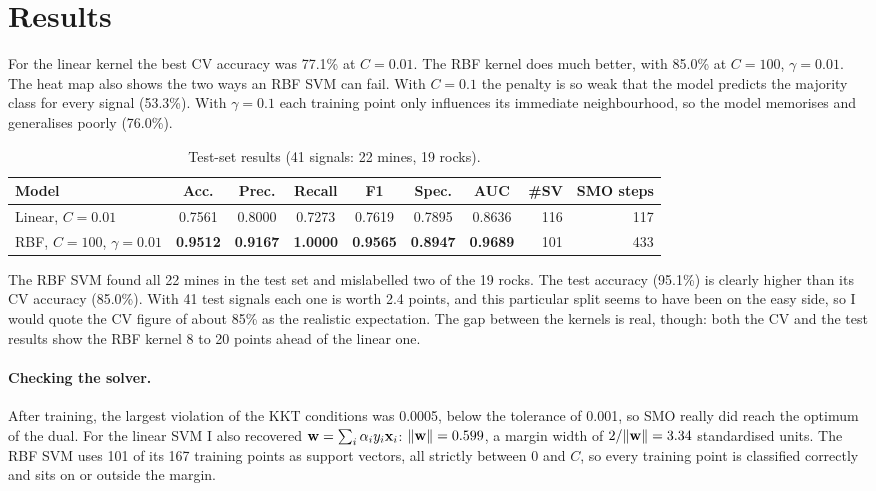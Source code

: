 \section{Results}

For the linear kernel the best CV accuracy was 77.1\% at $C=0.01$. The RBF kernel does much better,
with 85.0\% at $C=100$, $\gamma=0.01$. The heat map also shows the two ways an RBF SVM can fail. With
$C=0.1$ the penalty is so weak that the model predicts the majority class for every signal (53.3\%).
With $\gamma=0.1$ each training point only influences its immediate neighbourhood, so the model
memorises and generalises poorly (76.0\%).

\begin{table}[H]
\centering\footnotesize\setlength{\tabcolsep}{4pt}
\caption{Test-set results (41 signals: 22 mines, 19 rocks).}
\label{tab:svm-test}
\begin{tabular}{@{}l S[table-format=1.4] S[table-format=1.4] S[table-format=1.4] S[table-format=1.4] S[table-format=1.4] S[table-format=1.4] r r@{}}
\toprule
\textbf{Model} & {\textbf{Acc.}} & {\textbf{Prec.}} & {\textbf{Recall}} & {\textbf{F1}} & {\textbf{Spec.}} & {\textbf{AUC}} & \textbf{\#SV} & \textbf{SMO steps}\\
\midrule
Linear, $C=0.01$                 & 0.7561 & 0.8000 & 0.7273 & 0.7619 & 0.7895 & 0.8636 & 116 & 117\\
RBF, $C=100$, $\gamma=0.01$      & \bfseries 0.9512 & \bfseries 0.9167 & \bfseries 1.0000 & \bfseries 0.9565 & \bfseries 0.8947 & \bfseries 0.9689 & 101 & 433\\
\bottomrule
\end{tabular}
\end{table}

The RBF SVM found all 22 mines in the test set and mislabelled two of the 19 rocks. The test accuracy
(95.1\%) is clearly higher than its CV accuracy (85.0\%). With 41 test signals each one is worth 2.4
points, and this particular split seems to have been on the easy side, so I would quote the CV figure of
about 85\% as the realistic expectation. The gap between the kernels is real, though: both the CV and
the test results show the RBF kernel 8 to 20 points ahead of the linear one.

\paragraph{Checking the solver.} After training, the largest violation of the KKT conditions was
0.0005, below the tolerance of 0.001, so SMO really did reach the optimum of the dual. For the linear
SVM I also recovered $\mathbf{w}=\sum_i\alpha_iy_i\mathbf{x}_i$: $\|\mathbf{w}\|=0.599$, a margin width of
$2/\|\mathbf{w}\|=3.34$ standardised units. The RBF SVM uses 101 of its 167 training points as support
vectors, all strictly between 0 and $C$, so every training point is classified correctly and sits on or
outside the margin.

